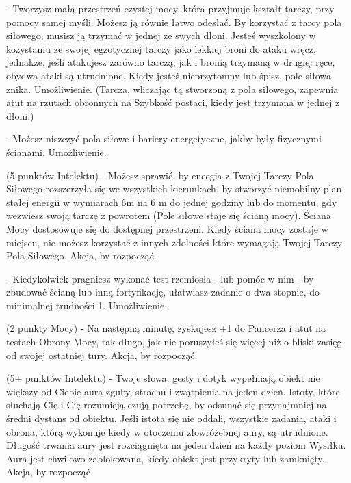 { - Tworzysz małą przestrzeń czystej mocy, która przyjmuje kształt tarczy, przy pomocy samej myśli. Możesz ją równie łatwo odesłać. By korzystać z tarcy pola siłowego, musisz ją trzymać w jednej ze swych dłoni. Jesteś wyszkolony w kozystaniu ze swojej egzotycznej tarczy jako lekkiej broni do ataku wręcz, jednakże, jeśli atakujesz zarówno tarczą, jak i bronią trzymaną w drugiej ręce, obydwa ataki są utrudnione. Kiedy jesteś nieprzytomny lub śpisz, pole siłowa znika. Umożliwienie. (Tarcza, wliczając tą stworzoną z pola siłowego, zapewnia atut na rzutach obronnych na Szybkość postaci, kiedy jest trzymana w jednej z dłoni.)

 - Możesz niszczyć pola siłowe i bariery energetyczne, jakby były fizycznymi ścianami. Umożliwienie.

 (5 punktów Intelektu) - Możesz sprawić, by eneegia z Twojej Tarczy Pola Siłowego rozszerzyła się we wszystkich kierunkach, by stworzyć niemobilny plan stałej energii w wymiarach 6m na 6 m do jednej godziny lub do momentu, gdy wezwiesz swoją tarczę z powrotem (Pole siłowe staje się ścianą mocy). Ściana Mocy dostosowuje się do dostępnej przestrzeni. Kiedy ściana mocy zostaje w miejscu, nie możesz korzystać z innych zdolności które wymagają Twojej Tarczy Pola Siłowego. Akcja, by rozpocząć. 

 - Kiedykolwiek pragniesz wykonać test rzemiosła - lub pomóc w nim - by zbudować ścianą lub inną fortyfikację, ułatwiasz zadanie o dwa stopnie, do minimalnej trudności 1. Umożliwienie. 

 (2 punkty Mocy) - Na następną minutę, zyskujesz +1 do Pancerza i atut na testach Obrony Mocy, tak długo, jak nie poruszyłeś się więcej niż o bliski zasięg od swojej ostatniej tury. Akcja, by rozpocząć. 

 (5+ punktów Intelektu) - Twoje słowa, gesty i dotyk wypełniają obiekt nie większy od Ciebie aurą zguby, strachu i zwątpienia na jeden dzień. Istoty, które słuchają Cię i Cię rozumieją czują potrzebę, by odsunąć się przynajmniej na średni dystans od obiektu. Jeśli istota się nie oddali, wszystkie zadania, ataki i obrona, którą wykonuje kiedy w otoczeniu złowróżebnej aury, są utrudnione. Długość trwania aury jest rozciągnięta na jeden dzień na każdy poziom Wysiłku. Aura jest chwilowo zablokowana, kiedy obiekt jest przykryty lub zamknięty. Akcja, by rozpocząć. 

}
